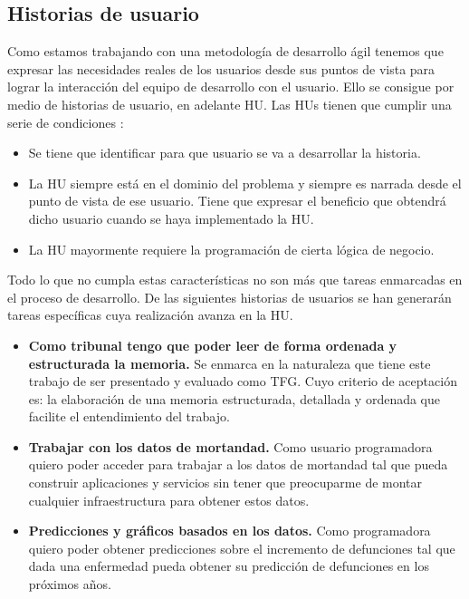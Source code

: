 \subsection{Historias de usuario}
\label{sec:hu2}
Como estamos trabajando con una metodología de desarrollo ágil tenemos que expresar las
necesidades reales de los usuarios desde sus puntos de vista para lograr la
interacción del equipo de desarrollo con el usuario. Ello se consigue por medio de
historias de usuario, en adelante HU. Las HUs tienen que cumplir una serie de condiciones \cite{dddjj}:
\begin{itemize}
    \item Se tiene que identificar para que usuario se va a desarrollar la historia.
    \item La HU siempre está en el dominio del problema y siempre es narrada desde el
    punto de vista de ese usuario. Tiene que expresar el beneficio que obtendrá dicho
    usuario cuando se haya implementado la HU.
    \item La HU mayormente requiere la programación de cierta lógica de negocio. 
\end{itemize}
Todo lo que no cumpla estas características no son más que tareas enmarcadas en el proceso
de desarrollo. De las siguientes historias de usuarios se han generarán tareas específicas
cuya realización avanza en la HU.
\begin{itemize}
    \item \textbf{Como tribunal tengo que poder leer de forma ordenada y estructurada la
    memoria.} 
    Se enmarca en la naturaleza que tiene este trabajo de ser presentado y
    evaluado como TFG. Cuyo criterio de aceptación es: la elaboración de una memoria
    estructurada, detallada y ordenada que facilite el entendimiento del trabajo.

    \item \textbf{Trabajar con los datos de mortandad.}
    Como usuario programadora
    quiero poder acceder para trabajar a los datos de mortandad
    tal que pueda construir aplicaciones y servicios sin tener que preocuparme de montar cualquier infraestructura para obtener estos datos.

    \item \textbf{Predicciones y gráficos basados en los datos.}
    Como programadora quiero poder obtener predicciones sobre el incremento de defunciones
    tal que dada una enfermedad pueda obtener su predicción de defunciones en los próximos años.
\end{itemize}

